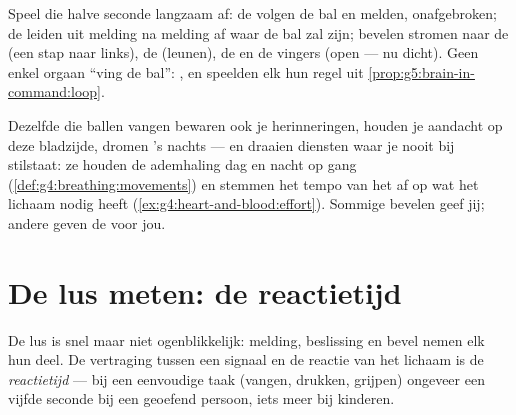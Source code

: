 \begin{example}\label{ex:g5:brain-in-command:catch}
Speel die halve seconde langzaam af: de  volgen de bal en melden,
onafgebroken; de  leiden uit melding na melding af waar de bal
zal zijn; bevelen stromen naar de  (een stap naar links), de 
(leunen), de  en de vingers (open --- nu dicht). Geen enkel orgaan
``ving de bal'': ,  en  speelden elk hun regel uit
\cref{prop:g5:brain-in-command:loop}.
\end{example}

\begin{remark}\label{rem:g5:brain-in-command:more}
Dezelfde  die ballen vangen bewaren ook je herinneringen, houden
je aandacht op deze bladzijde, dromen 's nachts --- en draaien diensten
waar je nooit bij stilstaat: ze houden de ademhaling dag en nacht op
gang (\cref{def:g4:breathing:movements}) en stemmen het tempo van het
 af op wat het lichaam nodig heeft
(\cref{ex:g4:heart-and-blood:effort}). Sommige bevelen geef jij; andere
geven de  voor jou.
\end{remark}

\section{De lus meten: de reactietijd}

\begin{definition}[Reactietijd]\label{def:g5:brain-in-command:reaction}
De lus is snel maar niet ogenblikkelijk: melding, beslissing en bevel
nemen elk hun deel. De vertraging tussen een signaal en de reactie van
het lichaam is de \emph{reactietijd} --- bij een
eenvoudige taak (vangen, drukken, grijpen) ongeveer een vijfde seconde
bij een geoefend persoon, iets meer bij kinderen.
\end{definition}

